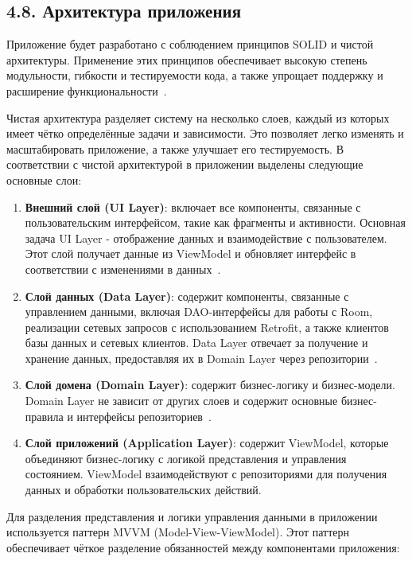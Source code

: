 \documentclass{vsureport}
\begin{document}
\subsection*{4.8. Архитектура приложения}

Приложение будет разработано с соблюдением принципов SOLID и чистой архитектуры. Применение этих принципов обеспечивает высокую степень модульности, гибкости и тестируемости кода, а также упрощает поддержку и расширение функциональности~\cite{ref3}.

Чистая архитектура разделяет систему на несколько слоев, каждый из которых имеет чётко определённые задачи и зависимости. Это позволяет легко изменять и масштабировать приложение, а также улучшает его тестируемость. В соответствии с чистой архитектурой в приложении выделены следующие основные слои:

\begin{enumerate}
    \item \textbf{Внешний слой (UI Layer)}: включает все компоненты, связанные с пользовательским интерфейсом, такие как фрагменты и активности. Основная задача UI Layer - отображение данных и взаимодействие с пользователем. Этот слой получает данные из ViewModel и обновляет интерфейс в соответствии с изменениями в данных~\cite{ref3}.
    \item \textbf{Слой данных (Data Layer)}: содержит компоненты, связанные с управлением данными, включая DAO-интерфейсы для работы с Room, реализации сетевых запросов с использованием Retrofit, а также клиентов базы данных и сетевых клиентов. Data Layer отвечает за получение и хранение данных, предоставляя их в Domain Layer через репозитории~\cite{ref3}.
    \item \textbf{Слой домена (Domain Layer)}: содержит бизнес-логику и бизнес-модели. Domain Layer не зависит от других слоев и содержит основные бизнес-правила и интерфейсы репозиториев~\cite{ref3}.
    \item \textbf{Слой приложений (Application Layer)}: содержит ViewModel, которые объединяют бизнес-логику с логикой представления и управления состоянием. ViewModel взаимодействуют с репозиториями для получения данных и обработки пользовательских действий.
\end{enumerate}

Для разделения представления и логики управления данными в приложении используется паттерн MVVM (Model-View-ViewModel). Этот паттерн обеспечивает чёткое разделение обязанностей между компонентами приложения:
\end{document}
